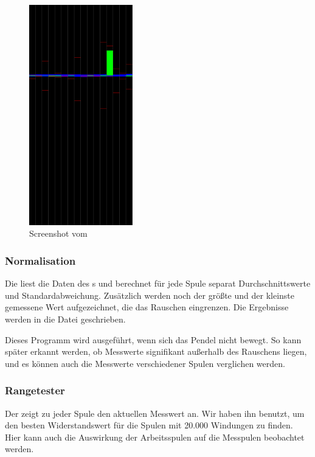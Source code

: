 \begin{figure}
  \includegraphics[width=0.4\textwidth]{images/rangetester.png}
  \caption{Screenshot vom }
  \label{fig:screenrangetester}
\end{figure}

\subsubsection{Normalisation}
Die  liest die Daten des s und berechnet für jede Spule separat Durchschnittswerte und Standardabweichung.
Zusätzlich werden noch der größte und der kleinste gemessene Wert aufgezeichnet, die das Rauschen eingrenzen.
Die Ergebnisse werden in die Datei  geschrieben.

Dieses Programm wird ausgeführt, wenn sich das Pendel nicht bewegt.
So kann später erkannt werden, ob Messwerte signifikant außerhalb des Rauschens liegen, und es können auch die Messwerte verschiedener Spulen verglichen werden.

\subsubsection{Rangetester}
Der  zeigt zu jeder Spule den aktuellen Messwert an.
Wir haben ihn benutzt, um den besten Widerstandswert für die Spulen mit 20.000 Windungen zu finden.
Hier kann auch die Auswirkung der Arbeitsspulen auf die Messpulen beobachtet werden.

